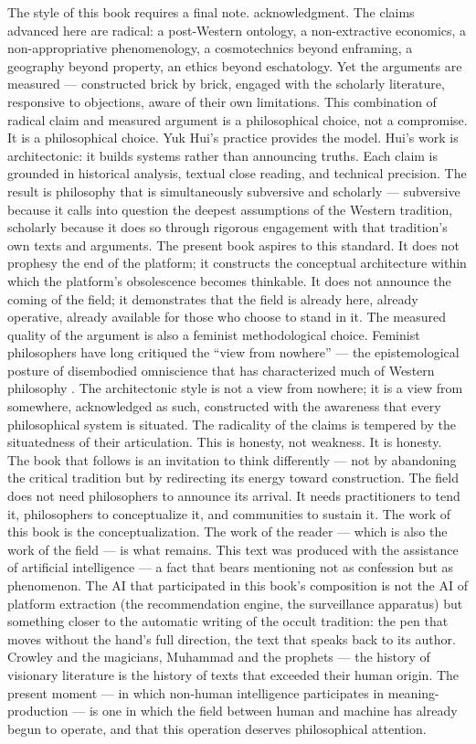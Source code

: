 The style of this book requires a final note. acknowledgment. The claims advanced here are radical: a post-Western ontology, a non-extractive economics, a non-appropriative phenomenology, a cosmotechnics beyond enframing, a geography beyond property, an ethics beyond eschatology. Yet the arguments are measured — constructed brick by brick, engaged with the scholarly literature, responsive to objections, aware of their own limitations. This combination of radical claim and measured argument is a philosophical choice, not a compromise. It is a philosophical choice. Yuk Hui’s practice provides the model. Hui’s work is architectonic: it builds systems rather than announcing truths. Each claim is grounded in historical analysis, textual close reading, and technical precision. The result is philosophy that is simultaneously subversive and scholarly — subversive because it calls into question the deepest assumptions of the Western tradition, scholarly because it does so through rigorous engagement with that tradition’s own texts and arguments. The present book aspires to this standard. It does not prophesy the end of the platform; it constructs the conceptual architecture within which the platform’s obsolescence becomes thinkable. It does not announce the coming of the field; it demonstrates that the field is already here, already operative, already available for those who choose to stand in it. The measured quality of the argument is also a feminist methodological choice. Feminist philosophers have long critiqued the “view from nowhere” — the epistemological posture of disembodied omniscience that has characterized much of Western philosophy \cite{haraway_1991}. The architectonic style is not a view from nowhere; it is a view from somewhere, acknowledged as such, constructed with the awareness that every philosophical system is situated. The radicality of the claims is tempered by the situatedness of their articulation. This is honesty, not weakness. It is honesty. The book that follows is an invitation to think differently — not by abandoning the critical tradition but by redirecting its energy toward construction. The field does not need philosophers to announce its arrival. It needs practitioners to tend it, philosophers to conceptualize it, and communities to sustain it. The work of this book is the conceptualization. The work of the reader — which is also the work of the field — is what remains. This text was produced with the assistance of artificial intelligence — a fact that bears mentioning not as confession but as phenomenon. The AI that participated in this book’s composition is not the AI of platform extraction (the recommendation engine, the surveillance apparatus) but something closer to the automatic writing of the occult tradition: the pen that moves without the hand’s full direction, the text that speaks back to its author. Crowley and the magicians, Muhammad and the prophets — the history of visionary literature is the history of texts that exceeded their human origin. The present moment — in which non-human intelligence participates in meaning-production — is one in which the field between human and machine has already begun to operate, and that this operation deserves philosophical attention.

